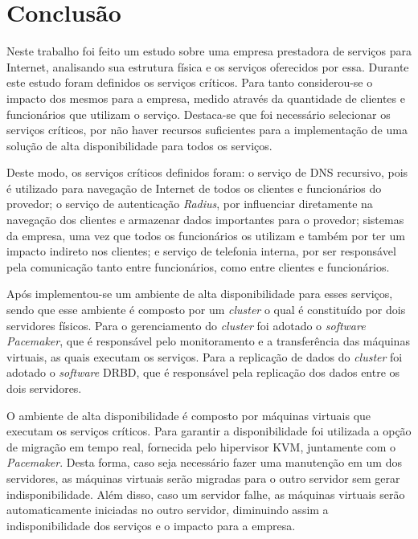 \chapter{Conclusão}
\label{cap:conclusao}

Neste trabalho foi feito um estudo sobre uma empresa prestadora de serviços para Internet, analisando sua estrutura física e os serviços oferecidos 
por essa. Durante este estudo foram definidos os serviços críticos. Para tanto considerou-se o impacto dos mesmos para a empresa, medido através
da quantidade de clientes e funcionários que utilizam o serviço. Destaca-se que foi necessário selecionar os serviços críticos, por não 
haver recursos suficientes para a implementação de uma solução de alta disponibilidade para todos os serviços.

Deste modo, os serviços críticos definidos foram: o serviço de \ac{DNS} recursivo, pois é utilizado para navegação de Internet de todos os clientes 
e funcionários do provedor; o serviço de autenticação \textit{Radius}, por influenciar diretamente na navegação dos clientes e armazenar dados 
importantes para o provedor; sistemas da empresa, uma vez que todos os funcionários os utilizam e também por ter um impacto indireto nos 
clientes; e serviço de telefonia interna, por ser responsável pela comunicação tanto entre funcionários, como entre clientes e funcionários.

Após implementou-se um ambiente de alta disponibilidade para esses serviços, sendo que esse ambiente é composto por um \textit{cluster} o qual é 
constituído por dois servidores físicos. Para o gerenciamento do \textit{cluster} foi adotado o \textit{software} \textit{Pacemaker}, que é 
responsável pelo monitoramento e a transferência das máquinas virtuais, as quais executam os serviços. Para a replicação de dados 
do \textit{cluster} foi adotado o \textit{software} \ac{DRBD}, que é responsável pela replicação dos dados entre os dois servidores.

O ambiente de alta disponibilidade é composto por máquinas virtuais que executam os serviços críticos. Para garantir a disponibilidade 
foi utilizada a opção de migração em tempo real, fornecida pelo hipervisor \ac{KVM}, juntamente com o \textit{Pacemaker}. Desta forma, caso seja 
necessário fazer uma manutenção em um dos servidores, as máquinas virtuais serão migradas para o outro servidor sem gerar indisponibilidade.
Além disso, caso um servidor falhe, as máquinas virtuais serão automaticamente iniciadas no outro servidor, diminuindo assim a indisponibilidade
dos serviços e o impacto para a empresa.


